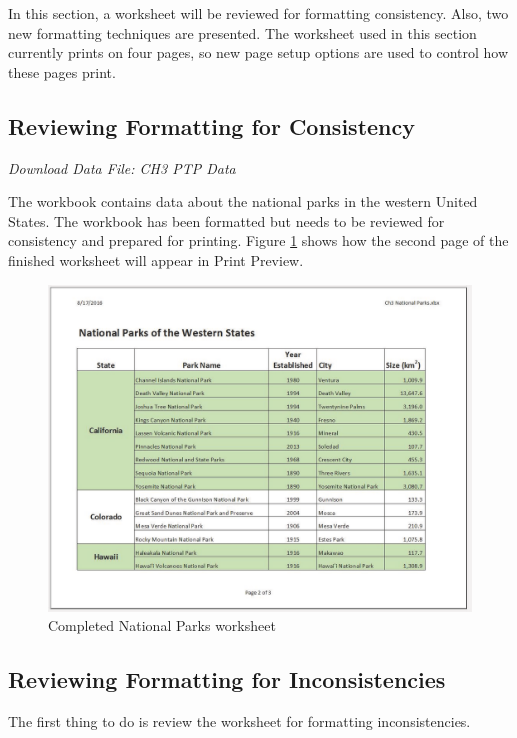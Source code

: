 In this section, a worksheet will be reviewed for formatting consistency. Also, two new formatting techniques are presented. The worksheet used in this section currently prints on four pages, so new page setup options are used to control how these pages print. 

\subsection{Reviewing Formatting for Consistency}

\textit{Download Data File: CH3 PTP Data}

The workbook contains data about the national parks in the western United States. The workbook has been formatted but needs to be reviewed for consistency and prepared for printing. Figure \ref{03:fig26} shows how the second page of the finished worksheet will appear in Print Preview.

\begin{figure}[H]
	\centering
	\includegraphics[width=\maxwidth{.95\linewidth}]{gfx/ch03_fig26}
	\caption{Completed National Parks worksheet}
	\label{03:fig26}
\end{figure}

\subsection{Reviewing Formatting for Inconsistencies}

The first thing to do is review the worksheet for formatting inconsistencies.


